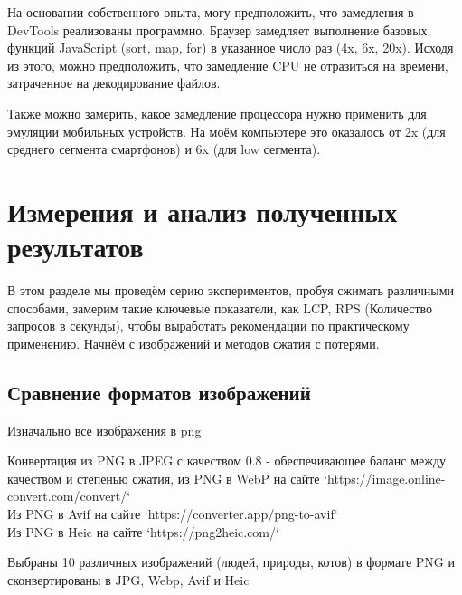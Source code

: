 \documentclass[12pt]{article}
\begin{document}
На основании собственного опыта, могу предположить, что замедления в DevTools
реализованы программно.
Браузер замедляет выполнение базовых функций JavaScript (sort, map, for) в указанное число раз (4x, 6x, 20x).
Исходя из этого, можно предположить, что замедление CPU не отразиться на времени,
затраченное на декодирование файлов.

Также можно замерить, какое замедление процессора нужно применить для эмуляции мобильных устройств. На моём компьютере это оказалось от 2x (для среднего сегмента смартфонов) и 6x (для low сегмента).

\section{Измерения и анализ полученных результатов}

В этом разделе мы проведём серию экспериментов, пробуя сжимать различными способами,
замерим такие ключевые показатели, как LCP, RPS (Количество запросов в секунды), чтобы
выработать рекомендации по практическому применению. Начнём с изображений и методов сжатия
с потерями.

\subsection{Сравнение форматов изображений}

Изначально все изображения в png

Конвертация из PNG в JPEG с качеством 0.8 - обеспечивающее баланс между качеством
и степенью сжатия, из PNG в WebP на сайте `https://image.online-convert.com/convert/`\\
Из PNG в Avif на сайте `https://converter.app/png-to-avif`\\
Из PNG в Heic на сайте `https://png2heic.com/`

Выбраны 10 различных изображений (людей, природы, котов)
в формате PNG и сконвертированы в JPG, Webp, Avif и Heic
\end{document}
